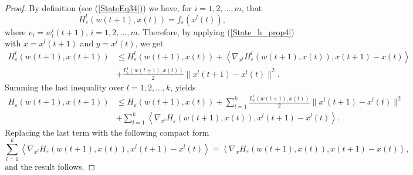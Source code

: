 \documentclass[12pt]{article}
\numberwithin{equation}{section}
\begin{document}
\begin{proof}
By definition (see (\ref{StateEq34})) we have, for $i=1,2, \ldots, m$, that
\begin{equation*}
	H^l_{\varepsilon}(w(t+1),x(t)) = f_{\varepsilon}(x^l(t)) ,
\end{equation*}
where $v_i=w^i_l(t+1)$, $i=1,2, \ldots, m$. Therefore, by applying (\ref{State_h_prop4}) with $x=x^l(t+1)$ and $y=x^l(t)$, we get
\begin{align*}
	H^l_{\varepsilon}(w(t+1),x(t+1)) 
	&\leq H^l_{\varepsilon}(w(t+1),x(t)) + \left\langle \nabla_{x^l} H^l_{\varepsilon}(w(t+1),x(t)), x(t+1)-x(t) \right\rangle \\
	&+ \frac{L^l_{\varepsilon}(w(t+1),x(t))}{2} \|x^l(t+1)-x^l(t)\|^2 .  
\end{align*}
Summing the last inequality over $l=1,2, \ldots, k$, yields
\begin{align*}
	H_{\varepsilon}(w(t+1),x(t+1)) 
	&\leq H_{\varepsilon}(w(t+1),x(t)) + \sum\limits_{l=1}^{k} \frac{L^l_{\varepsilon}(w(t+1),x(t))}{2} \|x^l(t+1)-x^l(t)\|^2 \\
	&+ \sum\limits_{l=1}^{k} \left\langle \nabla_{x^l} H_{\varepsilon}(w(t+1),x(t)), x^l(t+1)-x^l(t) \right\rangle   .
\end{align*}
Replacing the last term with the following compact form
\begin{equation*}
	\sum\limits_{l=1}^{k} \left\langle \nabla_{x^l} H_{\varepsilon}(w(t+1),x(t)), x^l(t+1)-x^l(t) \right\rangle  = \left\langle \nabla_x H_{\varepsilon}(w(t+1),x(t)), x(t+1)-x(t) \right\rangle ,
\end{equation*}
and the result follows.
\end{proof}
\end{document}
